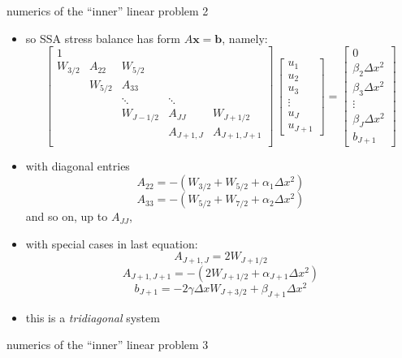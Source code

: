 \begin{frame}{numerics of the ``inner'' linear problem 2}

\scriptsize
\begin{itemize}
\item so SSA stress balance has form  \quad $A \mathbf{x} = \mathbf{b}$, \quad namely:
$$
\begin{bmatrix}
1 &  &  &  &  \\
W_{3/2} & A_{22} & W_{5/2} &  &  \\
 & W_{5/2} & A_{33} &  &  \\
 &  & \ddots & \ddots &  \\
 &  & W_{J-1/2} & A_{JJ} & W_{J+1/2} \\
 &  &  & A_{J+1,J} & A_{J+1,J+1} \\
\end{bmatrix}\,
\begin{bmatrix}
u_1 \\ u_2 \\ u_3 \\ \vdots \\ u_J \\ u_{J+1}
\end{bmatrix}
=
\begin{bmatrix}
0 \\ \beta_2 \Delta x^2 \\ \beta_3 \Delta x^2 \\ \vdots \\ \beta_J \Delta x^2 \\ b_{J+1}
\end{bmatrix}
$$
\item with diagonal entries
$$A_{22} = -(W_{3/2}+W_{5/2}+\alpha_1 \Delta x^2)$$
$$A_{33} = -(W_{5/2}+W_{7/2}+\alpha_2 \Delta x^2)$$
and so on, up to $A_{JJ}$, 
\item with special cases in last equation:
$$A_{J+1,J} = 2 W_{J+1/2}$$
$$A_{J+1,J+1} = -(2 W_{J+1/2}+\alpha_{J+1}\Delta x^2)$$
$$b_{J+1} = -2 \gamma \Delta x W_{J+3/2} + \beta_{J+1} \Delta x^2$$
\item this is a \emph{tridiagonal} system
\end{itemize}
\end{frame}


\begin{frame}{numerics of the ``inner'' linear problem 3}
\label{slide:flowlinecode}

\end{frame}


